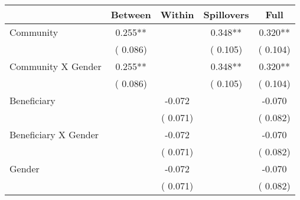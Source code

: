 
\begin{tabular}{l*{4}{c}}\hline&\multicolumn{1}{c}{Between}&\multicolumn{1}{c}{Within}&\multicolumn{1}{c}{Spillovers}&\multicolumn{1}{c}{Full}\\ \hline
 Community                                     &              0.255**      &                                               &        0.348** &         0.320**                            \\ 
                                                       &        (       0.086)           &                                       &       (       0.105)     &      (       0.104)                                           \\ 
 Community X Gender            &              0.255**      &                                               &        0.348** &         0.320**                            \\ 
                                                       &        (       0.086)           &                                       &       (       0.105)     &      (       0.104)                                           \\ 
 Beneficiary                           &                                               &       -0.072    &                                &            -0.070                            \\ 
                                                       &                                               & (       0.071)                  &                                        &      (       0.082)                                           \\ 
 Beneficiary X Gender          &                                               &       -0.072    &                                &            -0.070                            \\ 
                                                       &                                               & (       0.071)                  &                                        &      (       0.082)                                           \\ 
 Gender                                        &                              &       -0.072    &                                &            -0.070                            \\ 
                                                       &                                               & (       0.071)                  &                                        &      (       0.082)                                           \\ 

\end{tabular}
